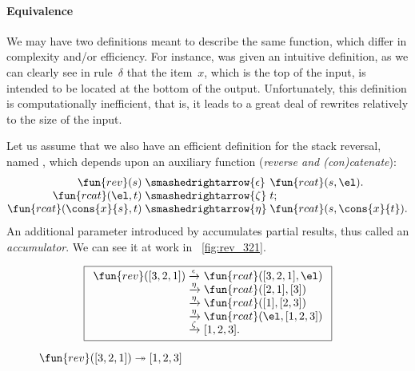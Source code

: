 \paragraph{Equivalence}

We may have two definitions meant to describe the same function, which
differ in complexity and/or efficiency. For instance,
 was given an intuitive
definition, as we can clearly see in rule~\(\delta\) that the
item~\(x\), which is the top of the input, is intended to be located
at the bottom of the output. Unfortunately, this definition is
computationally inefficient, that is, it leads to a great deal of
rewrites relatively to the size of the input.

Let us assume that we also have an efficient definition for the stack
reversal, named , which depends upon
an auxiliary function
(\emph{reverse and (con)catenate}):
\begin{equation}
  \begin{array}{@{}r@{\;}l@{\;}l@{}}
    \fun{rev}(s) & \smashedrightarrow{\epsilon} & \fun{rcat}(s,\el).\\
    \fun{rcat}(\el,t) & \smashedrightarrow{\zeta} & t;\\
    \fun{rcat}(\cons{x}{s},t) & \smashedrightarrow{\eta} &
    \fun{rcat}(s,\cons{x}{t}).
  \end{array}
  \label{def:rev}
\end{equation}
An additional parameter introduced by  accumulates partial
results, thus called an \emph{accumulator}. We can see it at work in
\fig~\vref{fig:rev_321}.
\begin{figure}[b]
\begin{equation*}
\boxed{%
\begin{array}{r@{\;}l@{\;}l}
\fun{rev}([3,2,1])
& \xrightarrow{\smash{\epsilon}} & \fun{rcat}([3,2,1],\el)\\
& \xrightarrow{\smash{\eta}}     & \fun{rcat}([2,1],[3])\\
& \xrightarrow{\smash{\eta}}     & \fun{rcat}([1],[2,3])\\
& \xrightarrow{\smash{\eta}}     & \fun{rcat}(\el,[1,2,3])\\
& \xrightarrow{\smash{\zeta}}    & [1,2,3].
\end{array}}
\end{equation*}
\caption{\(\fun{rev}([3,2,1]) \twoheadrightarrow [1,2,3]\)}
\label{fig:rev_321}
\end{figure}
